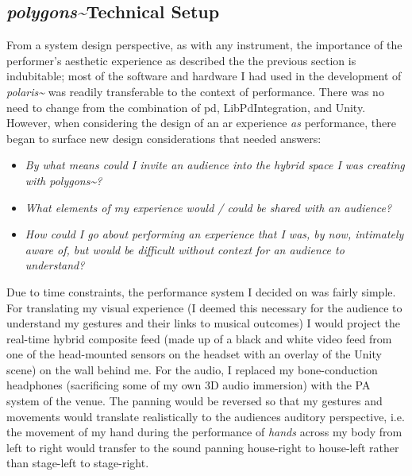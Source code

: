 \subsection{\textit{polygons\textasciitilde{}}Technical Setup}\label{sec: polygons-performances-setup}
From a system design perspective, as with any instrument, the importance of the performer's aesthetic experience as described the the previous section is indubitable; most of the software and hardware I had used in the development of \textit{polaris\textasciitilde{}} was readily transferable to the context of performance. There was no need to change from the combination of \gls{pd}, LibPdIntegration, and Unity. However, when considering the design of an \gls{ar} experience \textit{as} performance, there began to surface new design considerations that needed answers:
\begin{itemize}
    \item \textit{By what means could I invite an audience into the hybrid space I was creating with \textit{polygons\textasciitilde{}}?} 
    \item \textit{What elements of my experience would / could be shared with an audience?} 
    \item \textit{How could I go about performing an experience that I was, by now, intimately aware of, but would be difficult without context for an audience to understand?} 
\end{itemize}
Due to time constraints, the performance system I decided on was fairly simple. For translating my visual experience (I deemed this necessary for the audience to understand my gestures and their links to musical outcomes) I would project the real-time hybrid composite feed (made up of a black and white video feed from one of the head-mounted sensors on the headset with an overlay of the Unity scene) on the wall behind me. For the audio, I replaced my bone-conduction headphones (sacrificing some of my own 3D audio immersion) with the PA system of the venue. The panning would be reversed so that my gestures and movements would translate realistically to the audiences auditory perspective, i.e. the movement of my hand during the performance of \textit{hands} across my body from left to right would transfer to the sound panning house-right to house-left rather than stage-left to stage-right.

